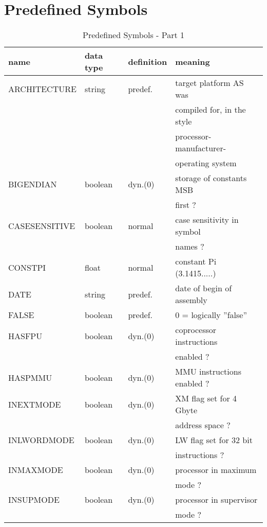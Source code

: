 \documentclass[12pt,twoside]{report}
\begin{document}



\cleardoublepage
\chapter{Predefined Symbols}
\label{AppInternSyms}

\begin{table*}[htb]
\begin{center}\begin{tabular}{|l|l|l|l|}
\hline
name          & data type & definition & meaning \\
\hline
\hline
ARCHITECTURE  & string    & predef.    & target platform AS was \\
              &           &            & compiled for, in the style \\
              &           &            & processor-manufacturer- \\
              &           &            & operating system \\
BIGENDIAN     & boolean   & dyn.(0)    & storage of constants MSB \\
              &           &            & first ? \\
CASESENSITIVE & boolean   & normal     & case sensitivity in symbol \\
              &           &            & names ? \\
CONSTPI       & float     & normal     & constant Pi (3.1415.....) \\
DATE          & string    & predef.    & date of begin of assembly \\
FALSE         & boolean   & predef.    & 0 = logically ''false'' \\
HASFPU        & boolean   & dyn.(0)    & coprocessor instructions \\
              &           &            & enabled ? \\
HASPMMU       & boolean   & dyn.(0)    & MMU instructions enabled ? \\
INEXTMODE     & boolean   & dyn.(0)    & XM flag set for 4 Gbyte \\
              &           &            & address space ? \\
INLWORDMODE   & boolean   & dyn.(0)    & LW flag set for 32 bit \\
              &           &            & instructions ? \\
INMAXMODE     & boolean   & dyn.(0)    & processor in maximum \\
              &           &            & mode ? \\
INSUPMODE     & boolean   & dyn.(0)    & processor in supervisor \\
              &           &            & mode ? \\
\hline
\end{tabular}\end{center}
\caption{Predefined Symbols - Part 1\label{TabInternSyms1}}
\end{table*}
\end{document}
